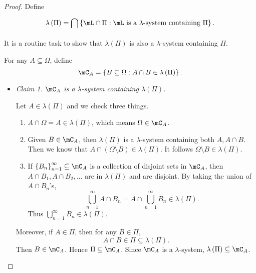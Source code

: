 \documentclass[stat901]{subfiles}
\begin{document}
    \begin{proof}
        Define
        \begin{equation*}
            \lambda\left( \Pi \right) = \bigcap^{}_{} \left\lbrace \mL\cap\Pi:\text{$\mL$ is a $\lambda$-system containing $\Pi$} \right\rbrace.
        \end{equation*}
        It is a routine task to show that $\lambda\left( \Pi \right)$ is also a $\lambda$-system containing $\Pi$.

        For any $A\subseteq\Omega$, define
        \begin{equation*}
            \mC_A = \left\lbrace B\subseteq\Omega : A\cap B\in\lambda\left( \Pi \right) \right\rbrace.
        \end{equation*}
        \begin{itemize}
            \item \textit{Claim 1. $\mC_A$ is a $\lambda$-system containing $\lambda\left( \Pi \right)$.}

                \begin{subproof}
                    Let $A\in\lambda\left( \Pi \right)$ and we check three things.
                    \begin{enumerate}
                        \item $A\cap\Omega = A \in \lambda\left( \Pi \right)$, which means $\Omega\in\mC_A$.
                        \item Given $B\in\mC_A$, then $\lambda\left( \Pi \right)$ is a $\lambda$-system containing both $A, A\cap B$. Then we know that $A\cap \left( \Omega\setminus B \right)\in\lambda\left( \Pi \right)$. It follows $\Omega\setminus B\in\lambda\left( \Pi \right)$.
                        \item If $\left\lbrace B_n \right\rbrace^{\infty}_{n=1}\subseteq\mC_A$ is a collection of disjoint sets in $\mC_A$, then $A\cap B_1, A\cap B_2, \ldots$ are in $\lambda\left( \Pi \right)$ and are disjoint. By taking the union of $A\cap B_n$'s,
                            \begin{equation*}
                                \bigcup^{\infty}_{n=1} A\cap B_n = A \cap \bigcup^{\infty}_{n=1} B_n \in\lambda\left( \Pi \right).
                            \end{equation*}
                            Thus $\bigcup^{\infty}_{n=1} B_n \in \lambda\left( \Pi \right)$.
                    \end{enumerate}
                    Moreover, if $A\in\Pi$, then for any $B\in\Pi$,
                    \begin{equation*}
                        A\cap B\in\Pi\subseteq\lambda\left( \Pi \right).
                    \end{equation*}
                    Then $B\in\mC_A$. Hence $\Pi\subseteq\mC_A$. Since $\mC_A$ is a $\lambda$-system, $\lambda\left( \Pi \right)\subseteq\mC_A$.
                \end{subproof}
        \end{itemize} 


\end{proof}
\end{document}
